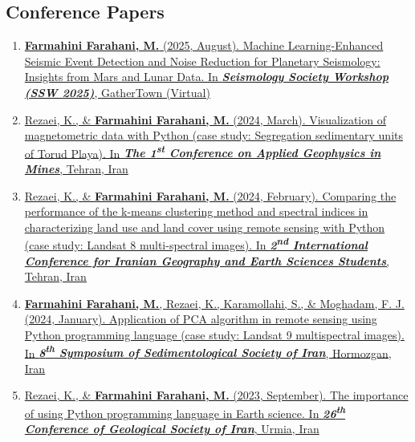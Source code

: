 \documentclass[letterpaper,11pt]{article}
\begin{document}
\begin{justify}
		\subsection*{Conference Papers}
		\begin{enumerate}[label=\arabic*.,left=0pt,topsep=7.5pt,partopsep=0pt,itemsep=3.5pt,parsep=0pt]
			\item \href{}{\textbf{Farmahini Farahani, M.} (2025, August). Machine Learning-Enhanced Seismic Event Detection and Noise Reduction for Planetary Seismology: Insights from Mars and Lunar Data. In \textit{\textbf{Seismology Society Workshop (SSW 2025)}}, GatherTown (Virtual) }
			\item \href{https://www.researchgate.net/publication/378739800_Visualization_of_magnetometric_data_with_Python_case_study_Segregation_sedimentary_units_of_Torud_Playa}{Rezaei, K., \& \textbf{Farmahini Farahani, M.} (2024, March). Visualization of magnetometric data with Python (case study: Segregation sedimentary units of Torud Playa). In \textit{\textbf{The 1\textsuperscript{st} Conference on Applied Geophysics in Mines}}, Tehran, Iran}
			\item \href{https://www.researchgate.net/publication/378307658_Comparing_the_performance_of_the_k-means_clustering_method_and_spectral_indices_in_characterizing_land_use_and_land_cover_using_remote_sensing_with_Python_case_study_Landsat_8_multi-spectral_images}{Rezaei, K., \& \textbf{Farmahini Farahani, M.} (2024, February). Comparing the performance of the k-means clustering method and spectral indices in characterizing land use and land cover using remote sensing with Python (case study: Landsat 8 multi-spectral images). In \textit{\textbf{2\textsuperscript{nd} International Conference for Iranian Geography and Earth Sciences Students}}, Tehran, Iran} 
			\item \href{https://www.researchgate.net/publication/377838524_Application_of_PCA_algorithm_in_remote_sensing_using_Python_programming_language_case_study_Landsat_9_multispectral_images}{\textbf{Farmahini Farahani, M.}, Rezaei, K., Karamollahi, S., \& Moghadam, F. J. (2024, January). Application of PCA algorithm in remote sensing using Python programming language (case study: Landsat 9 multispectral images). In \textit{\textbf{8\textsuperscript{th} Symposium of Sedimentological Society of Iran}}, Hormozgan, Iran}
			\item \href{https://www.researchgate.net/publication/374914382_The_importance_of_using_Python_programming_language_in_Earth_science}{Rezaei, K., \& \textbf{Farmahini Farahani, M.} (2023, September). The importance of using Python programming language in Earth science. In \textit{\textbf{26\textsuperscript{th} Conference of Geological Society of Iran}}, Urmia, Iran}
		\end{enumerate}
							\vspace{-0.6em}

\end{justify}
\end{document}
